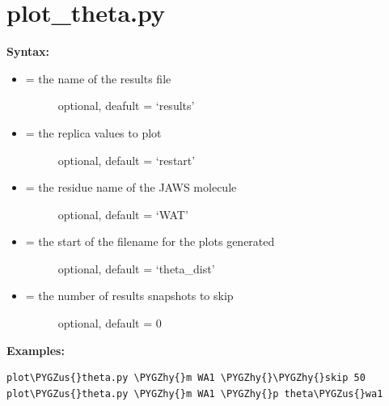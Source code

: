 \documentclass[letterpaper,10pt,english]{sphinxmanual}
\def\PYGZus{\char`\_}
\def\PYGZhy{\char`\-}
\begin{document}
\section{plot\_theta.py}
\label{tools:plot-theta-py}
\textbf{Syntax:}
\begin{itemize}
\item {} \begin{description}
\item[{ = the name of the results file}] \leavevmode
optional, deafult = `results'

\end{description}

\item {} \begin{description}
\item[{ = the replica values to plot}] \leavevmode
optional, default = `restart'

\end{description}

\item {} \begin{description}
\item[{ = the residue name of the JAWS molecule}] \leavevmode
optional, default = `WAT'

\end{description}

\item {} \begin{description}
\item[{ = the start of the filename for the plots generated}] \leavevmode
optional, default = `theta\_dist'

\end{description}

\item {} \begin{description}
\item[{ = the number of results snapshots to skip}] \leavevmode
optional, default = 0

\end{description}

\end{itemize}

\textbf{Examples:}

\begin{Verbatim}[commandchars=\\\{\}]
plot\PYGZus{}theta.py \PYGZhy{}m WA1 \PYGZhy{}\PYGZhy{}skip 50
plot\PYGZus{}theta.py \PYGZhy{}m WA1 \PYGZhy{}p theta\PYGZus{}wa1
\end{Verbatim}
\end{document}
